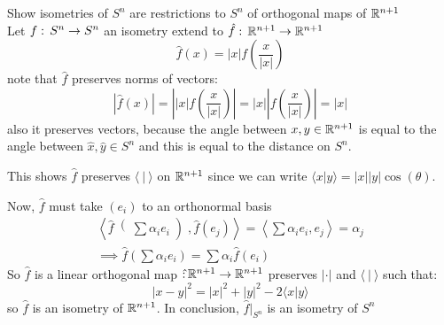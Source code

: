 Show isometries of $S^n$ are restrictions to $S^n$ of orthogonal maps of $\mathbb{R}^{n+1}$\\
Let $f:\, S^n \to S^n$ an isometry extend to $\hat f:\, \mathbb{R}^{n+1} \to \mathbb{R}^{n+1}$
$$\hat f(x) = |x| f\left( \frac{x}{|x|} \right)$$
note that $\hat f$ preserves norms of vectors:
$$ |\hat f(x) | = \left| |x| f\left( \frac{x}{|x|} \right)\right| =|x| \left| f\left( \frac{x}{|x|} \right)\right|= |x|$$
also it preserves vectors, because the angle between $x,y\in \mathbb{R}^{n+1}$ is equal to the angle between $\hat x, \hat y \in S^n$ and this is equal to the distance on $S^n$.

This shows $\hat f$ preserves $\langle\ | \ \rangle$ on $\mathbb{R}^{n+1}$ since we can write $\langle x| y \rangle = |x||y| \cos(\theta)$.

Now, $\hat f$ must take $(e_i) $ to an orthonormal basis 
\begin{gather*}
\left\langle \hat f\right(\sum \alpha_i e_i\left), \hat f(e_j)\right\rangle = \left\langle \sum \alpha_i e_i , e_j \right\rangle = \alpha_j \\
\implies \hat f\left(\sum \alpha_i e_i\right) = \sum \alpha_i \hat f(e_i)
\end{gather*}
So $\hat f$ is a linear orthogonal map $\hat {:\,} \mathbb{R}^{n+1} \to \mathbb{R}^{n+1}$ preserves $|\cdot|$ and $\langle \ | \ \rangle$ such that:
$$|x-y|^2 = |x|^2 + |y|^2 - 2\langle x| y\rangle$$
so $\hat f$ is an isometry of $\mathbb{R}^{n+1}$. In conclusion, $\hat f|_{S^n}$ is an isometry of $S^n$
